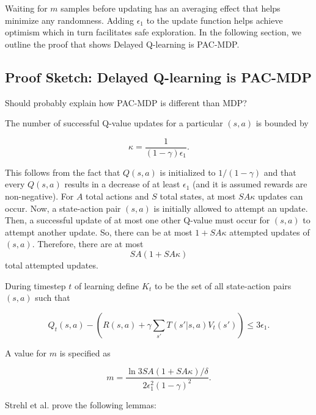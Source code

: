 \documentclass[10pt]{article}
\begin{document}
Waiting for $m$ samples before updating has an averaging effect that helps minimize any randomness. Adding $\epsilon_1$ to the update function helps achieve optimism which in turn facilitates safe exploration. %
In the following section, we outline the proof that shows Delayed Q-learning is PAC-MDP.


\subsection{Proof Sketch: Delayed Q-learning is PAC-MDP}

Should probably explain how PAC-MDP is different than MDP?

The number of successful Q-value updates for a particular $(s,a)$ is bounded by

$$\kappa = \frac{1}{(1-\gamma)\epsilon_1}.$$

This follows from the fact that $Q(s,a)$ is initialized to $1/(1-\gamma)$ and that every $Q(s,a)$ results in a decrease of at least $\epsilon_1$ (and it is assumed rewards are non-negative).  For $A$ total actions and $S$ total states, at most $SA\kappa$ updates can occur.  Now, a state-action pair $(s,a)$ is initially allowed to attempt an update.  Then, a successful update of at most one other Q-value must occur  for $(s,a)$ to attempt another update.  So, there can be at most $1+SA\kappa$ attempted updates of $(s,a)$.  Therefore, there are at most
$$SA(1+SA\kappa)$$
total attempted updates.

During timestep $t$ of learning define $K_t$ to be the set of all state-action pairs $(s,a)$ such that 

$$Q_t(s,a) - \left(R(s,a)+\gamma\sum_{s'}T(s'|s,a)V_t(s')\right) \leq 3\epsilon_1.$$

A value for $m$ is specified as 

$$m=\frac{\ln{3SA(1+SA\kappa)/\delta}}{2\epsilon_1^2(1-\gamma)^2}.$$

Strehl et al. prove the following lemmas:
\end{document}
